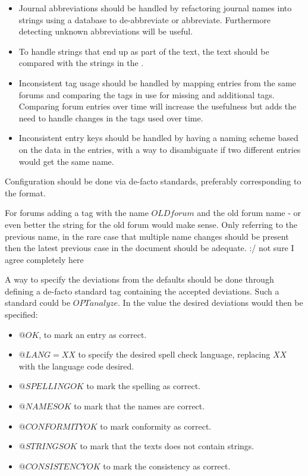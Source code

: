 \begin{itemize}
\item Journal abbreviations should be handled by refactoring journal
  names into strings using a database to de-abbreviate or abbreviate.
  Furthermore detecting unknown abbreviations will be useful.

\item To handle {\bibtex} strings that end up as part of the text, the
  text should be compared with the strings in the .

\item Inconsistent tag usage should be handled by mapping entries from
  the same forums and comparing the tags in use for missing and
  additional tags.  Comparing forum entries over time will increase
  the usefulness but adds the need to handle changes in the tags used
  over time.

\item Inconsistent entry keys should be handled by having a naming
  scheme based on the data in the entries, with a way to disambiguate
  if two different entries would get the same name.
\end{itemize}

Configuration should be done via de-facto standards, preferably
corresponding to the {\bibtex} format.

For forums adding a tag with the name $OLDforum$ and the old forum
name - or even better the string for the old forum would make sense.
Only referring to the previous name, in the rare case that multiple
name changes should be present then the latest previous case in the
document should be adequate. :/ not sure I agree completely here

A way to specify the deviations from the defaults should be done
through defining a de-facto standard tag containing the accepted
deviations.  Such a standard could be $OPTanalyze$.  In the value the
desired deviations would then be specified:

\begin{itemize}
\item $@OK$, to mark an entry as correct.
\item $@LANG=XX$ to specify the desired spell check language,
  replacing $XX$ with the language code desired.
\item $@SPELLINGOK$ to mark the spelling as correct.
\item $@NAMESOK$ to mark that the names are correct.
\item $@CONFORMITYOK$ to mark conformity as correct.
\item $@STRINGSOK$ to mark that the texts does not contain strings.
\item $@CONSISTENCYOK$ to mark the consistency as correct.
\end{itemize}

